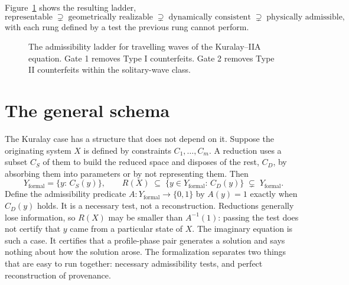 \documentclass[11pt]{article}
\theoremstyle{definition}
\theoremstyle{remark}
\newcommand{\Yf}{Y_{\mathrm{formal}}}
\begin{document}
Figure~\ref{fig:ladder} shows the resulting ladder,
\[
  \text{representable}\;\supsetneq\;\text{geometrically realizable}\;\supsetneq\;\text{dynamically consistent}\;\supsetneq\;\text{physically admissible},
\]
with each rung defined by a test the previous rung cannot perform.

\begin{figure}[t]
\centering
{}
\caption{The admissibility ladder for travelling waves of the Kuralay--IIA equation. Gate 1 removes Type I counterfeits. Gate 2 removes Type II counterfeits within the solitary-wave class.}
\label{fig:ladder}
\end{figure}

\section{The general schema}

The Kuralay case has a structure that does not depend on it. Suppose the originating system $X$ is defined by constraints $C_1,\dots,C_m$. A reduction uses a subset $C_S$ of them to build the reduced space and disposes of the rest, $C_D$, by absorbing them into parameters or by not representing them. Then
\begin{equation}
  \Yf=\{y:\,C_S(y)\},\qquad R(X)\;\subseteq\;\{y\in\Yf:\,C_D(y)\}\;\subsetneq\;\Yf .
  \label{eq:schema}
\end{equation}
Define the admissibility predicate $A:\Yf\to\{0,1\}$ by $A(y)=1$ exactly when $C_D(y)$ holds. It is a necessary test, not a reconstruction. Reductions generally lose information, so $R(X)$ may be smaller than $A^{-1}(1)$: passing the test does not certify that $y$ came from a particular state of $X$. The imaginary equation is such a case. It certifies that a profile-phase pair generates a solution and says nothing about how the solution arose. The formalization separates two things that are easy to run together: necessary admissibility tests, and perfect reconstruction of provenance.
\end{document}
